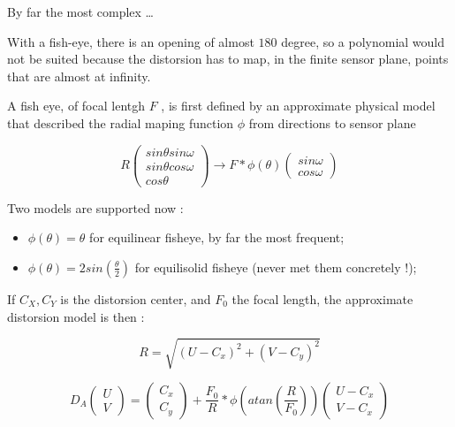 \label{SpGeo:FishEye}

By far the most complex \dots

With a fish-eye, there is an opening of almost $180$ degree, so a polynomial
would not be suited because the distorsion has to map, in the finite sensor plane,
points that are almost at infinity.

A fish eye, of focal lentgh $F$ , is first defined by an approximate physical model that described
the radial maping function $\phi$ from directions to sensor plane

\begin{equation}
    R  \begin{pmatrix}   sin \theta sin \omega \\  sin \theta cos \omega  \\  cos \theta  \end{pmatrix}
   \rightarrow  F * \phi(\theta) \begin{pmatrix} sin \omega \\ cos \omega  \end{pmatrix}
\end{equation}

Two models are supported now :

\begin{itemize}
   \item $\phi(\theta)=\theta$ for equilinear fisheye, by far the most frequent;
   \item $\phi(\theta)=2 sin(\frac{\theta}{2})$  for equilisolid fisheye (never met
         them concretely !);
\end{itemize}

If $C_X,C_Y$ is the distorsion center,  and $F_0$ the focal length,
the approximate distorsion model is then :

\begin{equation}
   R = \sqrt{(U-C_x)^2 + (V-C_y)^2}
\end{equation}




\begin{equation}
   D_A\begin{pmatrix}U\\V\end{pmatrix}
   = \begin{pmatrix}C_x\\C_y\end{pmatrix}
     +    \frac{F_0}{R} * \phi(atan(\frac{R}{F_0}))  \begin{pmatrix}U-C_x\\ V-C_x\end{pmatrix}
\end{equation}

